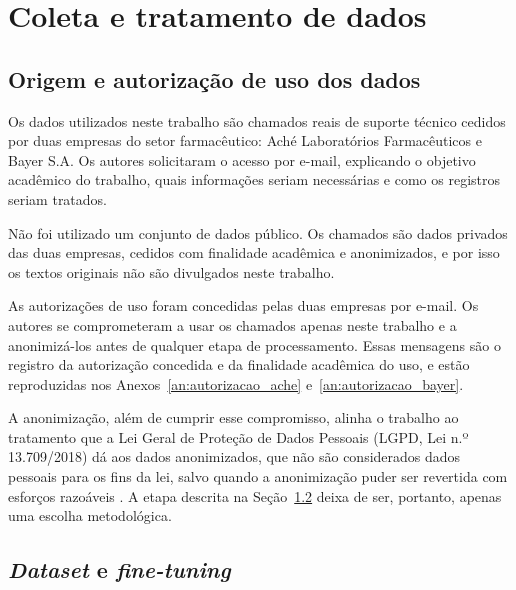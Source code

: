 \documentclass[
    12pt,                %
    openright,           %
    oneside,             %
    a4paper,             %
    english,             %
    brazil               %
]{abntex2}
\begin{document}
\section{Coleta e tratamento de dados}
\subsection{Origem e autorização de uso dos dados}
\label{subsubsec:autorizacao_dados}

Os dados utilizados neste trabalho são chamados reais de suporte
técnico cedidos por duas empresas do setor farmacêutico: Aché
Laboratórios Farmacêuticos e Bayer S.A. Os autores solicitaram o
acesso por e-mail, explicando o objetivo acadêmico do trabalho, quais
informações seriam necessárias e como os registros seriam tratados.

Não foi utilizado um conjunto de dados público. Os chamados são dados privados das duas empresas, cedidos com finalidade acadêmica e anonimizados, e por isso os textos originais não são divulgados neste trabalho.

As autorizações de uso foram concedidas pelas duas empresas por e-mail.
Os autores se comprometeram a usar os chamados apenas neste trabalho e a
anonimizá-los antes de qualquer etapa de processamento. Essas mensagens
são o registro da autorização concedida e da finalidade acadêmica do uso, e estão
reproduzidas nos Anexos~\ref{an:autorizacao_ache}
e~\ref{an:autorizacao_bayer}.

A anonimização, além de cumprir esse compromisso, alinha o trabalho ao
tratamento que a Lei Geral de Proteção de Dados Pessoais (LGPD, Lei
n.º 13.709/2018) dá aos dados anonimizados, que não são considerados
dados pessoais para os fins da lei, salvo quando a anonimização puder
ser revertida com esforços razoáveis \cite{brasil2018}. A etapa
descrita na Seção~\ref{subsubsec:dataset_finetuning} deixa de ser,
portanto, apenas uma escolha metodológica.



\subsection{\textit{Dataset} e \textit{fine-tuning}}
\label{subsubsec:dataset_finetuning}
\end{document}
